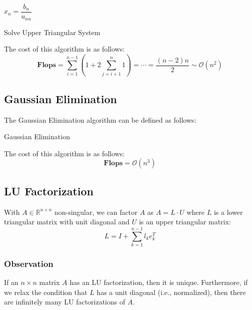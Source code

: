 \documentclass[11pt]{article}
\begin{document}
\begin{algorithm}[H]
$x_n = \dfrac{b_n}{u_{nn}}$\;
\caption{Solve Upper Triangular System}
\end{algorithm}
\vskip 0.5cm
The cost of this algorithm is as follows:
\[\textbf{Flops} = \sum_{i=1}^{n-1} \left(1 + 2\sum_{j=i+1}^{n} 1\right) = \cdots = \dfrac{(n-2)n}{2} \sim \mathcal{O}(n^2)\]

\subsection{Gaussian Elimination}
The Gaussian Elimination algorithm can be defined as follows:

\begin{algorithm}[H]
\caption{Gaussian Elimination}
\end{algorithm}
\vskip 0.5cm
The cost of this algorithm is as follows:
\[\textbf{Flops} = \mathcal{O}(n^3)\]

\subsection{LU Factorization}
With \(A \in \mathbb{R}^{n \times n}\) non-singular, we can factor \(A\) as \(A = L \cdot U\) where \(L\) is a lower triangular matrix with unit diagonal and \(U\) is an upper triangular matrix:
\[L = I + \sum_{k=1}^{n-1} l_k e_k^T \]

\subsubsection*{Observation}
If an \(n \times n\) matrix \(A\) has an LU factorization, then it is unique. Furthermore, if we relax the condition that \(L\) has a unit diagonal (i.e., normalized), then there are infinitely many LU factorizations of \(A\).
\end{document}

